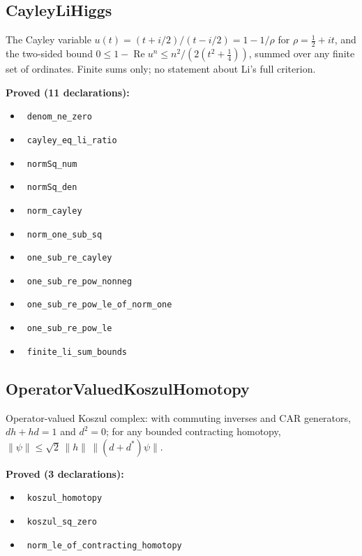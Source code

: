 \documentclass{report}
\theoremstyle{definition}
\begin{document}
\subsection{CayleyLiHiggs}
The Cayley variable $u(t)=(t+i/2)/(t-i/2)=1-1/\rho$ for $\rho=\tfrac12+it$, and the two-sided bound $0\le 1-\operatorname{Re}u^n\le n^2/(2(t^2+\tfrac14))$, summed over any finite set of ordinates. Finite sums only; no statement about Li's full criterion.

\noindent\textbf{Proved (11 declarations):}
\begin{itemize}
  \item {}\leanok\ \texttt{denom\_ne\_zero}
  \item {}\leanok\ \texttt{cayley\_eq\_li\_ratio}
  \item {}\leanok\ \texttt{normSq\_num}
  \item {}\leanok\ \texttt{normSq\_den}
  \item {}\leanok\ \texttt{norm\_cayley}
  \item {}\leanok\ \texttt{norm\_one\_sub\_sq}
  \item {}\leanok\ \texttt{one\_sub\_re\_cayley}
  \item {}\leanok\ \texttt{one\_sub\_re\_pow\_nonneg}
  \item {}\leanok\ \texttt{one\_sub\_re\_pow\_le\_of\_norm\_one}
  \item {}\leanok\ \texttt{one\_sub\_re\_pow\_le}
  \item {}\leanok\ \texttt{finite\_li\_sum\_bounds}
\end{itemize}

\subsection{OperatorValuedKoszulHomotopy}
Operator-valued Koszul complex: with commuting inverses and CAR generators, $dh+hd=1$ and $d^2=0$; for any bounded contracting homotopy, $\|\psi\|\le\sqrt2\,\|h\|\,\|(d+d^*)\psi\|$.

\noindent\textbf{Proved (3 declarations):}
\begin{itemize}
  \item {}\leanok\ \texttt{koszul\_homotopy}
  \item {}\leanok\ \texttt{koszul\_sq\_zero}
  \item {}\leanok\ \texttt{norm\_le\_of\_contracting\_homotopy}
\end{itemize}
\end{document}
